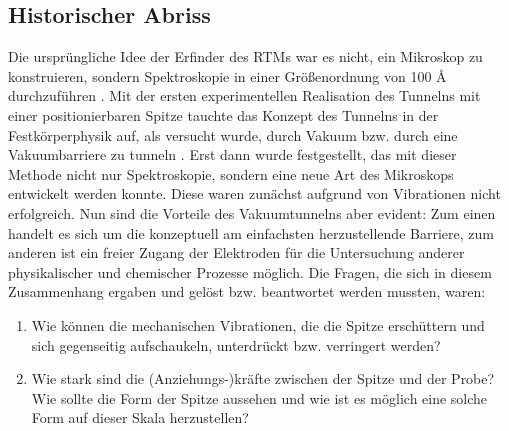 \subsection{Historischer Abriss}
Die ursprüngliche Idee der Erfinder des RTMs 
war es nicht, ein Mikroskop zu konstruieren,
sondern Spektroskopie in einer Größenordnung von 
100 \r{A} durchzuführen \cite{binnig1987scanning}.
Mit der ersten experimentellen Realisation \cite{thompson1976thermal}
des Tunnelns mit einer positionierbaren Spitze tauchte das 
Konzept des Tunnelns in der 
Festkörperphysik auf, als versucht wurde, durch Vakuum bzw. durch
eine Vakuumbarriere zu tunneln \cite{binnig1982tunneling}. 
Erst dann wurde festgestellt, das mit dieser Methode nicht nur
Spektroskopie, sondern eine neue Art des Mikroskops entwickelt werden
konnte.
Diese
waren zunächst aufgrund von Vibrationen nicht erfolgreich. Nun sind
die Vorteile des Vakuumtunnelns aber evident: 
Zum einen handelt es sich um die konzeptuell am einfachsten
herzustellende Barriere, zum anderen ist ein freier Zugang 
der Elektroden für die Untersuchung anderer
physikalischer und chemischer Prozesse möglich.
Die Fragen, die sich in diesem Zusammenhang
ergaben und gelöst bzw. beantwortet werden mussten, waren:

\begin{enumerate}
\item Wie können die mechanischen Vibrationen, die die Spitze
erschüttern und sich gegenseitig aufschaukeln, unterdrückt bzw.
verringert werden?
\item Wie stark sind die (Anziehungs-)kräfte zwischen der Spitze
und der Probe? Wie sollte die Form der Spitze aussehen und wie
ist es möglich eine solche Form auf dieser Skala herzustellen?
\end{enumerate}

